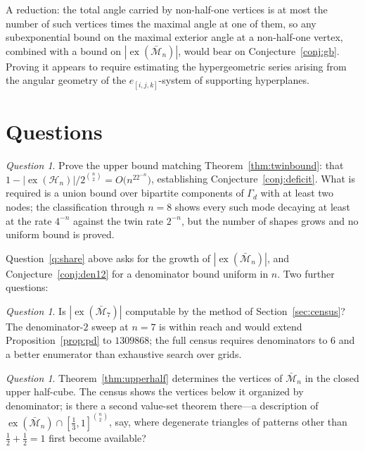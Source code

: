 \documentclass[11pt]{article}
\theoremstyle{definition}
\theoremstyle{remark}
\newtheorem{question}[theorem]{Question}
\newcommand{\bM}{\bar{\mathcal{M}}}
\newcommand{\Ha}{\mathcal{H}}
\newcommand{\ex}{\operatorname{ex}}
\begin{document}
A reduction: the total angle carried by non-half-one vertices is at most
the number of such vertices times the maximal angle at one of them, so any subexponential
bound on the maximal exterior angle at a non-half-one vertex, combined with a bound on
$|\ex(\bM_n)|$, would bear on Conjecture~\ref{conj:gb}. Proving it appears to require
estimating the hypergeometric series arising from the angular geometry of the
$e_{[i,j,k]}$-system of supporting hyperplanes.

\section{Questions}
\label{sec:questions}

\begin{question}\label{q:deficit}
Prove the upper bound matching Theorem~\ref{thm:twinbound}: that
$1-|\ex(\Ha_n)|/2^{\binom n2}=O\bigl(n^22^{-n}\bigr)$, establishing
Conjecture~\ref{conj:deficit}. What is required is a union bound over bipartite components
of $\Gamma_d$ with at least two nodes; the classification through $n=8$ shows every such
mode decaying at least at the rate $4^{-n}$ against the twin rate $2^{-n}$, but the number
of shapes grows and no uniform bound is proved.
\end{question}

Question~\ref{q:share} above asks for the growth of $|\ex(\bM_n)|$, and
Conjecture~\ref{conj:den12} for a denominator bound uniform in $n$. Two further questions:

\begin{question}
Is $|\ex(\bM_7)|$ computable by the method of Section~\ref{sec:census}? The denominator-$2$
sweep at $n=7$ is within reach and would extend Proposition~\ref{prop:pd} to $1309868$;
the full census requires denominators to $6$ and a better enumerator than exhaustive search
over grids.
\end{question}

\begin{question}
Theorem~\ref{thm:upperhalf} determines the vertices of $\bM_n$ in the closed upper
half-cube. The census shows the vertices below it organized by denominator; is there a
second value-set theorem there---a description of
$\ex(\bM_n)\cap[\tfrac13,1]^{\binom n2}$, say, where degenerate triangles of patterns
other than $\tfrac12+\tfrac12=1$ first become available?
\end{question}
\end{document}
